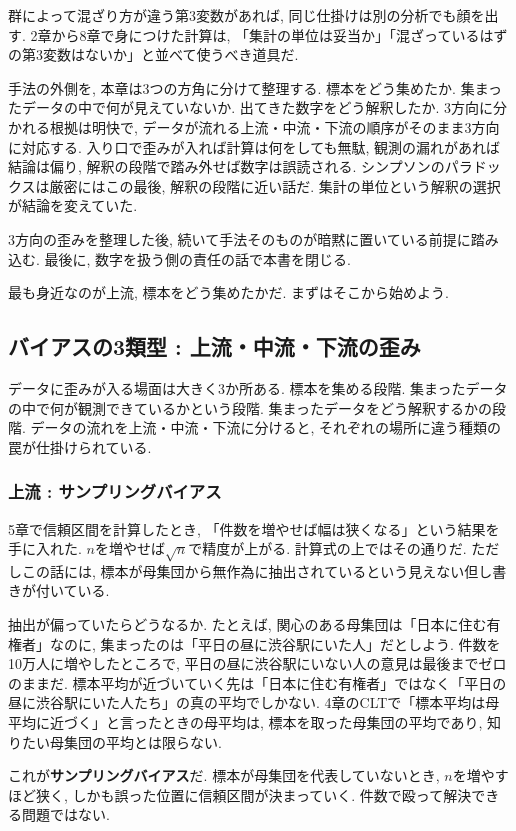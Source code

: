 群によって混ざり方が違う第3変数があれば, 同じ仕掛けは別の分析でも顔を出す.
2章から8章で身につけた計算は, 「集計の単位は妥当か」「混ざっているはずの第3変数はないか」と並べて使うべき道具だ.

手法の外側を, 本章は3つの方角に分けて整理する.
標本をどう集めたか. 集まったデータの中で何が見えていないか. 出てきた数字をどう解釈したか.
3方向に分かれる根拠は明快で, データが流れる上流・中流・下流の順序がそのまま3方向に対応する.
入り口で歪みが入れば計算は何をしても無駄, 観測の漏れがあれば結論は偏り, 解釈の段階で踏み外せば数字は誤読される.
シンプソンのパラドックスは厳密にはこの最後, 解釈の段階に近い話だ. 集計の単位という解釈の選択が結論を変えていた.

3方向の歪みを整理した後, 続いて手法そのものが暗黙に置いている前提に踏み込む.
最後に, 数字を扱う側の責任の話で本書を閉じる.

最も身近なのが上流, 標本をどう集めたかだ. まずはそこから始めよう.


\subsection{バイアスの3類型 : 上流・中流・下流の歪み}

データに歪みが入る場面は大きく3か所ある.
標本を集める段階. 集まったデータの中で何が観測できているかという段階. 集まったデータをどう解釈するかの段階.
データの流れを上流・中流・下流に分けると, それぞれの場所に違う種類の罠が仕掛けられている.

\subsubsection*{上流 : サンプリングバイアス}

5章で信頼区間を計算したとき, 「件数を増やせば幅は狭くなる」という結果を手に入れた.
$n$を増やせば$\sqrt{n}$で精度が上がる. 計算式の上ではその通りだ.
ただしこの話には, 標本が母集団から無作為に抽出されているという見えない但し書きが付いている.

抽出が偏っていたらどうなるか.
たとえば, 関心のある母集団は「日本に住む有権者」なのに, 集まったのは「平日の昼に渋谷駅にいた人」だとしよう.
件数を10万人に増やしたところで, 平日の昼に渋谷駅にいない人の意見は最後までゼロのままだ.
標本平均が近づいていく先は「日本に住む有権者」ではなく「平日の昼に渋谷駅にいた人たち」の真の平均でしかない.
4章のCLTで「標本平均は母平均に近づく」と言ったときの母平均は, 標本を取った母集団の平均であり, 知りたい母集団の平均とは限らない.

これが\textbf{サンプリングバイアス}だ.
標本が母集団を代表していないとき, $n$を増やすほど狭く, しかも誤った位置に信頼区間が決まっていく.
件数で殴って解決できる問題ではない.

